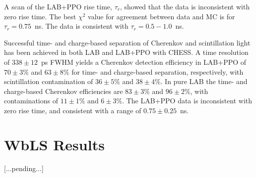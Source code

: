 A scan of the LAB+PPO rise time, $\tau_r$, showed that the data is inconsistent with zero rise time.  The best $\chi^2$ value for  agreement between data and MC is for $\tau_r=0.75$~ns. The data is consistent with $\tau_r=0.5-1.0$~ns.


Successful  time- and charge-based separation of Cherenkov and scintillation light has been achieved in both LAB and LAB+PPO with CHESS. 
A time resolution of $338\pm12$~ps FWHM yields a Cherenkov detection efficiency in LAB+PPO of  
$70 \pm 3 \%$ and $63\pm8$\% for time- and charge-based separation, respectively, with scintillation contamination of  $36\pm5\%$ and $38\pm4$\%.  In pure LAB the time- and charge-based Cherenkov efficiencies are $83\pm3\%$ and $96\pm2$\%, with contaminations of $11\pm1\%$ and $6\pm3$\%.
The LAB+PPO  data  is  inconsistent with zero rise time, and consistent with a range of $0.75\pm0.25$~ns.  


\section{WbLS Results}
\label{sec:wbls}
[...pending...]
